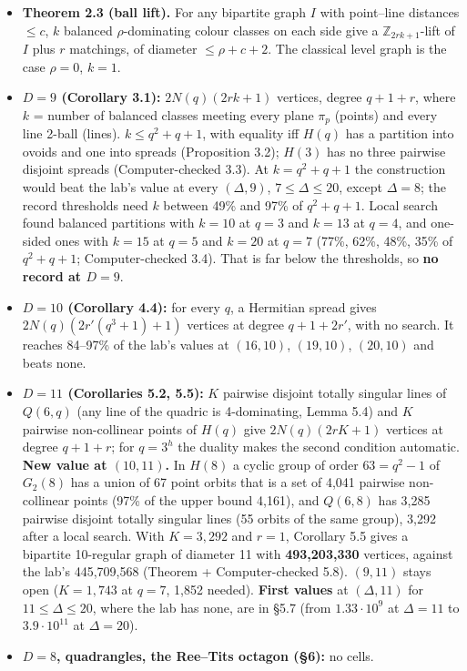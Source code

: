 \documentclass[
  10pt,
]{article}
\providecommand{\tightlist}{%
  \setlength{\itemsep}{0pt}\setlength{\parskip}{0pt}}
\begin{document}
\begin{itemize}
\tightlist
\item
  \textbf{Theorem 2.3 (ball lift).} For any bipartite graph \(I\) with
  point--line distances \(\le c\), \(k\) balanced \(\rho\)-dominating
  colour classes on each side give a \(\mathbb Z_{2rk+1}\)-lift of \(I\)
  plus \(r\) matchings, of diameter \(\le\rho+c+2\). The classical level
  graph is the case \(\rho = 0\), \(k = 1\).
\item
  \textbf{\(D = 9\) (Corollary 3.1):} \(2N(q)(2rk+1)\) vertices, degree
  \(q+1+r\), where \(k\) = number of balanced classes meeting every
  plane \(\pi_p\) (points) and every line 2-ball (lines).
  \(k\le q^2+q+1\), with equality iff \(H(q)\) has a partition into
  ovoids and one into spreads (Proposition 3.2); \(H(3)\) has no three
  pairwise disjoint spreads (Computer-checked 3.3). At \(k = q^2+q+1\)
  the construction would beat the lab's value at every \((\Delta, 9)\),
  \(7\le\Delta\le 20\), except \(\Delta = 8\); the record thresholds
  need \(k\) between 49\% and 97\% of \(q^2+q+1\). Local search found
  balanced partitions with \(k = 10\) at \(q = 3\) and \(k = 13\) at
  \(q = 4\), and one-sided ones with \(k = 15\) at \(q = 5\) and
  \(k = 20\) at \(q = 7\) (77\%, 62\%, 48\%, 35\% of \(q^2+q+1\);
  Computer-checked 3.4). That is far below the thresholds, so \textbf{no
  record at \(D = 9\)}.
\item
  \textbf{\(D = 10\) (Corollary 4.4):} for every \(q\), a Hermitian
  spread gives \(2N(q)(2r'(q^3+1)+1)\) vertices at degree \(q+1+2r'\),
  with no search. It reaches 84--97\% of the lab's values at
  \((16,10)\), \((19,10)\), \((20,10)\) and beats none.
\item
  \textbf{\(D = 11\) (Corollaries 5.2, 5.5):} \(K\) pairwise disjoint
  totally singular lines of \(Q(6,q)\) (any line of the quadric is
  4-dominating, Lemma 5.4) and \(K\) pairwise non-collinear points of
  \(H(q)\) give \(2N(q)(2rK+1)\) vertices at degree \(q+1+r\); for
  \(q = 3^h\) the duality makes the second condition automatic.
  \textbf{New value at \((10,11)\).} In \(H(8)\) a cyclic group of order
  \(63 = q^2-1\) of \(G_2(8)\) has a union of 67 point orbits that is a
  set of 4,041 pairwise non-collinear points (97\% of the upper bound
  4,161), and \(Q(6,8)\) has 3,285 pairwise disjoint totally singular
  lines (55 orbits of the same group), 3,292 after a local search. With
  \(K = 3{,}292\) and \(r = 1\), Corollary 5.5 gives a bipartite
  10-regular graph of diameter 11 with \textbf{493,203,330} vertices,
  against the lab's 445,709,568 (Theorem + Computer-checked 5.8).
  \((9,11)\) stays open (\(K = 1{,}743\) at \(q = 7\), 1,852 needed).
  \textbf{First values} at \((\Delta,11)\) for \(11\le\Delta\le 20\),
  where the lab has none, are in §5.7 (from \(1.33\cdot10^9\) at
  \(\Delta = 11\) to \(3.9\cdot10^{11}\) at \(\Delta = 20\)).
\item
  \textbf{\(D = 8\), quadrangles, the Ree--Tits octagon (§6):} no cells.
\end{itemize}
\end{document}
